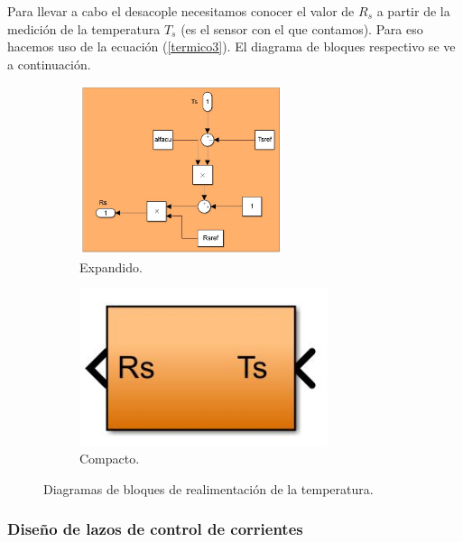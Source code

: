\documentclass{article}
\begin{document}
Para llevar a cabo el desacople necesitamos conocer el valor de $R_s$ a partir de la medición de la 
temperatura $T_s$ (es el sensor con el que contamos). Para eso hacemos uso de la ecuación (\ref{termico3}).
El diagrama de bloques respectivo se ve a continuación.

\begin{figure}[H]
    \begin{subfigure}[b]{0.65\textwidth}
        \centering
        \includegraphics[width=0.65\textwidth]{realimentacion_temperatura.jpg}
        \caption{Expandido.}
    \end{subfigure}
    \begin{subfigure}[b]{0.24\textwidth}
        \centering
        \includegraphics[width=0.8\textwidth]{realimentacion_temperatura_compacto.jpg}
        \caption{Compacto.}
    \end{subfigure}
    \caption{Diagramas de bloques de realimentación de la temperatura.}
\end{figure}


\subsubsection{Diseño de lazos de control de corrientes}
\end{document}
